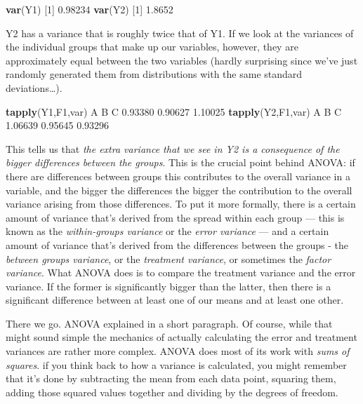 \documentclass[
]{book}
\newenvironment{Shaded}{\begin{snugshade}}{\end{snugshade}}
\newcommand{\DecValTok}[1]{\textcolor[rgb]{0.00,0.00,0.81}{#1}}
\newcommand{\FloatTok}[1]{\textcolor[rgb]{0.00,0.00,0.81}{#1}}
\newcommand{\KeywordTok}[1]{\textcolor[rgb]{0.13,0.29,0.53}{\textbf{#1}}}
\newcommand{\NormalTok}[1]{#1}
\begin{document}
\begin{Shaded}
\begin{Highlighting}[]
\KeywordTok{var}\NormalTok{(Y1)}
\NormalTok{[}\DecValTok{1}\NormalTok{] }\FloatTok{0.98234}
\KeywordTok{var}\NormalTok{(Y2)}
\NormalTok{[}\DecValTok{1}\NormalTok{] }\FloatTok{1.8652}
\end{Highlighting}
\end{Shaded}

Y2 has a variance that is roughly twice that of Y1. If we look at the variances of the individual groups that make up our variables, however, they are approximately equal between the two variables (hardly surprising since we've just randomly generated them from distributions with the same standard deviations\ldots).

\begin{Shaded}
\begin{Highlighting}[]
\KeywordTok{tapply}\NormalTok{(Y1,F1,var)}
\NormalTok{      A       B       C }
\FloatTok{0.93380} \FloatTok{0.90627} \FloatTok{1.10025} 
\KeywordTok{tapply}\NormalTok{(Y2,F1,var)}
\NormalTok{      A       B       C }
\FloatTok{1.06639} \FloatTok{0.95645} \FloatTok{0.93296} 
\end{Highlighting}
\end{Shaded}

This tells us that \emph{the extra variance that we see in Y2 is a consequence of the bigger differences between the groups}. This is the crucial point behind ANOVA: if there are differences between groups this contributes to the overall variance in a variable, and the bigger the differences the bigger the contribution to the overall variance arising from those differences. To put it more formally, there is a certain amount of variance that's derived from the spread within each group --- this is known as the \emph{within-groups variance} or the \emph{error variance} --- and a certain amount of variance that's derived from the differences between the groups - the \emph{between groups variance}, or the \emph{treatment variance}, or sometimes the \emph{factor variance}. What ANOVA does is to compare the treatment variance and the error variance. If the former is significantly bigger than the latter, then there is a significant difference between at least one of our means and at least one other.

There we go. ANOVA explained in a short paragraph. Of course, while that might sound simple the mechanics of actually calculating the error and treatment variances are rather more complex. ANOVA does most of its work with \emph{sums of squares}. if you think back to how a variance is calculated, you might remember that it's done by subtracting the mean from each data point, squaring them, adding those squared values together and dividing by the degrees of freedom.
\end{document}
